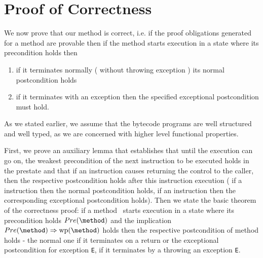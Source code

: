 
\newcommand{\state}[1]{ \tau_{#1} } 
\newcommand{\straightBraces}[1]{ \texttt{ (} #1 \texttt{ )} }

\newcommand{\tbc}{\textit{TBC}}

\newtheorem{lemma1}{Progress lemma }
\newtheorem{th1}{Correctness }




\section{Proof of Correctness } \label{proof}

 
We now prove that our method is correct, i.e. if the proof obligations generated for a method are provable then if the method starts
execution in a state where its precondition holds then  
\begin{enumerate}
\item if it terminates normally ( without throwing exception ) its normal  postcondition holds
\item if it terminates with an exception then the specified exceptional postcondition must hold.
\end{enumerate}
As we stated earlier, we assume that the bytecode programs are well structured and well typed, as we are concerned with higher level functional properties. 


 First, we prove an auxiliary lemma that establishes that until the execution can go on, the weakest precondition of the next instruction to be executed holds in the prestate and that if an instruction causes returning the control to the caller, then the respective postcondition holds after this instruction execution ( if a  instruction then the normal postcondition holds, if an  instruction then the corresponding exceptional postcondition holds).
 Then we state the basic theorem of the correctness proof: if a method \method \ starts execution in  a state where its precondition holds $Pre( \method)$ 
and the implication  $Pre( \method)  \Rightarrow \rm{wp}(\method) $ holds  then the  respective postcondition of method \method holds - 
the normal  one if it terminates on a return or the exceptional postcondition for exception \texttt{E}, if it terminates by a throwing an exception \texttt{E}. 

